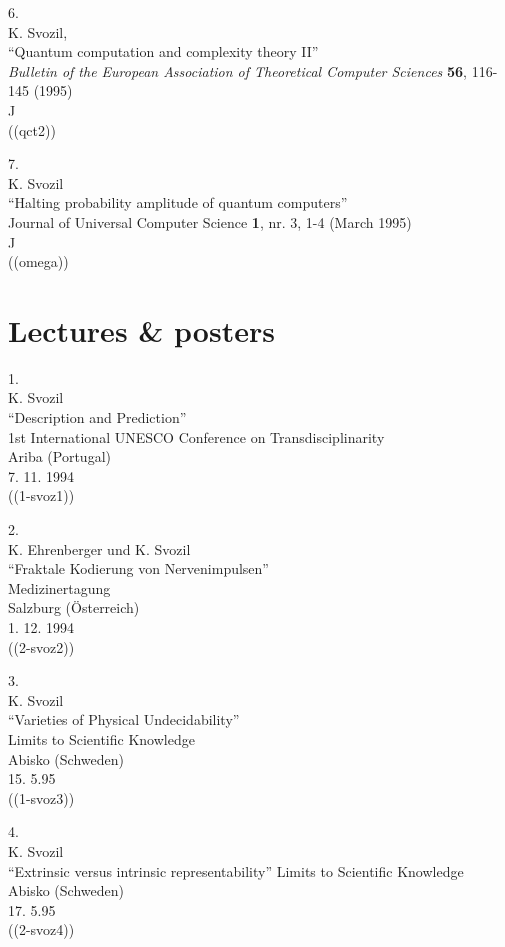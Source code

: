 6.\\
K. Svozil,\\
``Quantum computation and complexity theory II''\\
{\sl Bulletin of the European Association of Theoretical Computer
Sciences} {\bf 56}, 116-145 (1995)\\
J\\
((qct2))

7.\\
K. Svozil\\
``Halting probability amplitude of quantum
computers''\\
 Journal of Universal Computer Science
{\bf 1}, nr. 3, 1-4 (March 1995)\\
J\\
((omega))




\section{Lectures \& posters}


1.\\
K. Svozil\\
``Description and Prediction'' \\
1st International UNESCO Conference  on  Transdisciplinarity\\
Ariba (Portugal)\\
7. 11. 1994\\
((1-svoz1))


2.\\
K. Ehrenberger und K. Svozil\\
``Fraktale Kodierung von Nervenimpulsen'' \\
Medizinertagung\\
Salzburg (\"Osterreich)\\
1. 12. 1994\\
((2-svoz2))


3.\\
K. Svozil\\
``Varieties of Physical Undecidability''\\
Limits to Scientific Knowledge\\
Abisko (Schweden)\\
15. 5.95\\
((1-svoz3))

4.\\
K. Svozil\\
``Extrinsic versus intrinsic representability''
Limits to Scientific Knowledge\\
Abisko (Schweden)\\
17. 5.95  \\
((2-svoz4))

